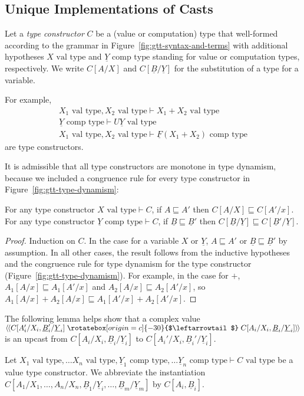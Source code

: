 \documentclass[acmsmall,nonacm]{acmart}
\renewcommand{\u}{\underline}
\newcommand{\vtype}{\,\,\text{val type}}
\newcommand{\ctype}{\,\,\text{comp type}}
\newcommand{\ltdyn}{\sqsubseteq}
\newcommand{\uarrow}{\mathrel{\rotatebox[origin=c]{-30}{$\leftarrowtail$}}}
\newcommand{\defupcast}[2]{\langle\kern-1ex~\langle{#2}\uarrow{#1}\rangle\kern-1ex~\rangle}
\begin{document}
\subsection{Unique Implementations of Casts}

\begin{longonly}
\begin{definition}
  Let a \emph{type constructor} $C$ be a (value or computation) type that
  well-formed according to the grammar in Figure~\ref{fig:gtt-syntax-and-terms} with
  additional hypotheses $X \vtype$ and $\u Y \ctype$ standing for value
  or computation types, respectively.  We write $C[A/X]$ and $C[\u B/\u
    Y]$ for the substitution of a type for a variable.  
\end{definition}
For example,
\[
\begin{array}{l}
  X_1 \vtype, X_2 \vtype \vdash X_1 + X_2 \vtype \\
  \u Y \ctype \vdash U \u Y \vtype \\
  X_1 \vtype, X_2 \vtype \vdash \u F(X_1 + X_2) \ctype
\end{array}
\]
are type constructors.

It is admissible that all type constructors are monotone in type
dynamism, because we included a congruence rule for every type
constructor in Figure~\ref{fig:gtt-type-dynamism}:  

\begin{lemma}
  For any type constructor $X \vtype \vdash C$, if $A \ltdyn A'$ then
  $C[A/X] \ltdyn C[A'/x]$.  For any type constructor $\u Y \ctype \vdash
  C$, if $\u B \ltdyn \u B'$ then $C[\u B/\u Y] \ltdyn C[\u B'/\u Y]$.
\end{lemma}
\begin{proof}
Induction on $C$.  In the case for a variable $X$ or $\u Y$, $A \ltdyn
A'$ or $\u B \ltdyn \u B'$ by assumption.  In all other cases, the
result follows from the inductive hypotheses and the congruence rule for
type dynamism for the type constructor
(Figure~\ref{fig:gtt-type-dynamism}).  For example, in the case for $+$,
$A_1[A/x] \ltdyn A_1[A'/x]$ and $A_2[A/x] \ltdyn A_2[A'/x]$, so
$A_1[A/x] + A_2[A/x] \ltdyn A_1[A'/x] + A_2[A'/x]$.
\end{proof}

The following lemma helps show that a complex value
$\defupcast{C[A_i/X_i,\u B_i/\u Y_i]}{C[A_i'/X_i,\u B_i'/\u Y_i]}$ is an
upcast from $C[A_i/X_i,\u B_i/\u Y_i]$ to $C[A_i'/X_i,\u B_i'/\u Y_i]$.
\begin{lemma} \label{lem:upcast}
  Let $X_1 \vtype, \ldots X_n \vtype, \u Y_1 \ctype, \ldots \u Y_n
  \ctype \vdash C \vtype$ be a value type constructor.  We abbreviate
  the instantiation \\ $C[A_1/X_1,\ldots,A_n/X_n,\u B_1/\u Y_i,\ldots,\u
    B_m/\u Y_m]$ by $C[A_i,\u B_i]$.


\end{lemma}
\end{longonly}
\end{document}

